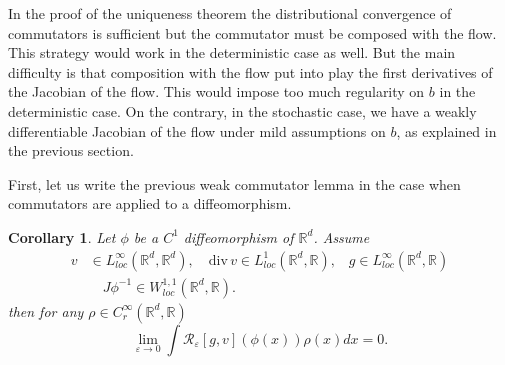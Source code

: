 \documentclass[a4paper,10pt]{article}
\newtheorem{corollary}[theorem]{Corollary}
\begin{document}
\vskip 2mm In the proof of the uniqueness theorem the
distributional convergence of commutators is sufficient but the
commutator must be composed with the flow. This strategy would
work in the deterministic case as well. But the main difficulty is
that composition with the flow put into play the first derivatives
of the Jacobian of the flow. This would impose too much regularity
on $b$ in the deterministic case. On the contrary, in the
stochastic case, we have a weakly differentiable Jacobian of the
flow under mild assumptions on $b$, as explained in the previous
section.

First, let us write the previous weak commutator lemma in the case when
commutators are applied to a diffeomorphism.


\begin{corollary}
\label{corollary commutator}Let $\phi$ be a $C^{1}$ diffeomorphism of
$\mathbb{R}^{d}$. Assume
\begin{align*}
v  &  \in L_{loc}^{\infty}\left(
\mathbb{R}^{d},\mathbb{R}^{d}\right) ,\quad{\mathrm{div}\, }v\in
L_{loc}^{1}\left(  \mathbb{R}^{d},\mathbb{R}\right),\;\;\; g \in
L_{loc}^{\infty}\left( \mathbb{R}^{d},\mathbb{R}\right)\\ & \quad
J\phi^{-1}\in W_{loc}^{1,1}\left(\mathbb{R}^{d},\mathbb{R}\right).
\end{align*}
then for any $\rho \in C_r^\infty(  \mathbb{R}^{d},\mathbb{R})$
\[
\lim_{\varepsilon\rightarrow0}\int\mathcal{R}_{\varepsilon}\left[  g,v\right]
\left(  \phi\left(  x\right)  \right)  \rho\left(  x\right)  dx=0.
\]
\end{corollary}
\end{document}
